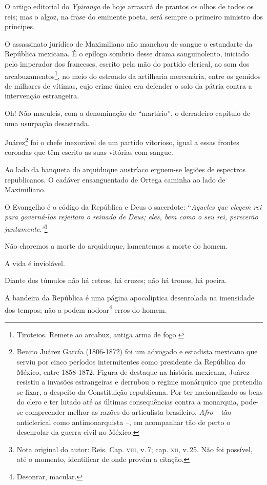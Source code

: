 O artigo editorial do \emph{Ypiranga} de hoje arrasará de prantos os
olhos de todos os reis; mas o algoz, na frase do eminente poeta, será
sempre o primeiro ministro dos príncipes.

O assassinato jurídico de Maximiliano não manchou de sangue o estandarte
da República mexicana. É o epílogo sombrio desse drama sanguinolento,
iniciado pelo imperador dos franceses, escrito pela mão do partido
clerical, ao som dos arcabuzamentos\footnote{Tiroteios. Remete ao
  arcabuz, antiga arma de fogo.}, no meio do estrondo da artilharia
mercenária, entre os gemidos de milhares de vítimas, cujo crime único
era defender o solo da pátria contra a intervenção estrangeira.

Oh! Não maculeis, com a denominação de ``martírio'', o derradeiro capítulo
de uma usurpação desastrada.

Juárez\footnote{Benito Juárez García (1806-1872) foi um advogado e
  estadista mexicano que serviu por cinco períodos intermitentes como
  presidente da República do México, entre 1858-1872. Figura de destaque
  na história mexicana, Juárez resistiu a invasões estrangeiras e
  derrubou o regime monárquico que pretendia se fixar, a despeito da
  Constituição republicana. Por ter nacionalizado os bens do clero e ter
  lutado até as últimas consequências contra a monarquia, pode-se
  compreender melhor as razões do articulista brasileiro, \emph{Afro} --
  tão anticlerical como antimonarquista --, em acompanhar tão de perto o
  desenrolar da guerra civil no México.} foi o chefe inexorável de um
partido vitorioso, igual a essas frontes coroadas que têm escrito as
suas vitórias com sangue.

Ao lado da banqueta do arquiduque austríaco erguem-se legiões de
espectros republicanos. O cadáver ensanguentado de Ortega caminha ao
lado de Maximiliano.

O Evangelho é o código da República e Deus o sacerdote: ``\emph{Aqueles
que elegem rei para governá-los rejeitam o reinado de Deus; eles, bem
como o seu rei, perecerão juntamente.''}\footnote{Nota original do
  autor: Reis. Cap. \textsc{viii}, v.\,7; cap. \textsc{xii}, v.\,25. Não foi possível, até o
  momento, identificar de onde provém a citação.}

Não choremos a morte do arquiduque, lamentemos a morte do homem.

A vida é inviolável.

Diante dos túmulos não há cetros, há cruzes; não há tronos, há poeira.

A bandeira da República é uma página apocalíptica desenrolada na
imensidade dos tempos; não a podem nodoar\footnote{Desonrar, macular.}
erros do homem.

